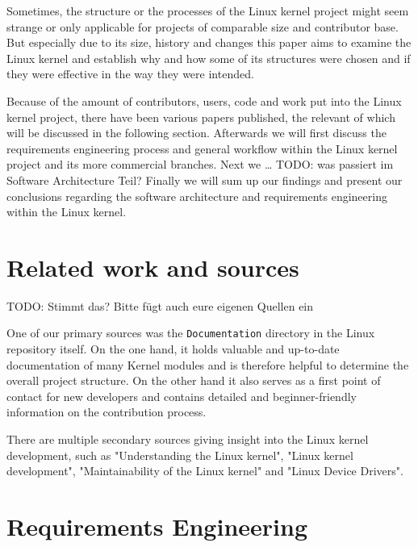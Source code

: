 \documentclass{sig-alternate-05-2015}
\begin{document}

Sometimes, the structure or the processes of the Linux kernel project might seem strange or only applicable for projects of comparable size and contributor base.
But especially due to its size, history and changes this paper aims to examine the Linux kernel and establish why and how some of its structures were chosen and if they were effective in the way they were intended.


Because of the amount of contributors, users, code and work put into the Linux kernel project, there have been various papers published, the relevant of which will be discussed in the following section.
Afterwards we will first discuss the requirements engineering process and general workflow within the Linux kernel project and its more commercial branches.
Next we … TODO: was passiert im Software Architecture Teil?
Finally we will sum up our findings and present our conclusions regarding the software architecture and requirements engineering within the Linux kernel.

\section{Related work and sources}

TODO: Stimmt das? Bitte fügt auch eure eigenen Quellen ein

One of our primary sources was the \texttt{Documentation} directory in the Linux repository itself.
On the one hand, it holds valuable and up-to-date documentation of many Kernel modules and is therefore helpful to determine the overall project structure.
On the other hand it also serves as a first point of contact for new developers and contains detailed and beginner-friendly information on the contribution process.

There are multiple secondary sources giving insight into the Linux kernel development, such as "Understanding the Linux kernel"\cite{bovet2005understanding}, "Linux kernel development"\cite{love2010linux}, "Maintainability of the Linux kernel"\cite{schach2002maintainability} and "Linux Device Drivers"\cite{Corbet:2005:LDD:1209083}.


\section{Requirements Engineering}
\end{document}
